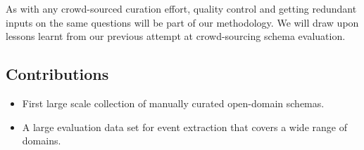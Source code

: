 As with any crowd-sourced curation effort, quality control and getting redundant inputs on the same questions will be part of our methodology. We will draw upon lessons learnt from our previous attempt at crowd-sourcing schema evaluation.

\subsection{Contributions}

\begin{itemize}[noitemsep,nolistsep]
\item First large scale collection of manually curated open-domain schemas. 
\item A large evaluation data set for event extraction that covers a wide range of domains.
\end{itemize}
